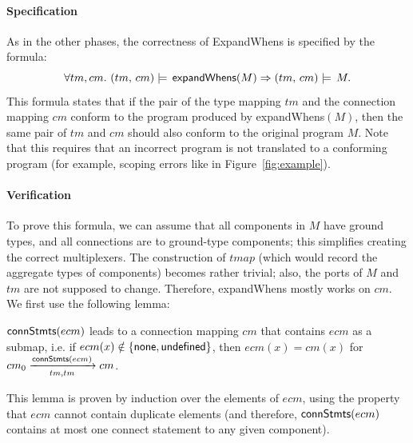 

\paragraph*{Specification}
As in the other phases, the correctness of {ExpandWhens} is specified by the formula:
%
\begin{equation}\label{eqn:expand-whens-spec}
    \forall tm, cm.\ (tm,\,cm) \models \, {\sf expandWhens}(M) \Rightarrow (tm,\,cm) \models \,M.
\end{equation}
%
This formula states that if the pair of the type mapping $tm$ and the connection mapping $cm$ conform to the program produced by {\sf expandWhens}$(M)$,
then the same pair of $tm$ and $cm$ should also conform to the original program $M$.
Note that this requires that an incorrect program is not translated to a conforming program
(for example, scoping errors like in Figure~\ref{fig:example}).

\paragraph*{Verification}
To prove this formula, we can assume that all components in $M$ have ground types,
and all connections are to ground-type components;
this simplifies creating the correct multiplexers.
The construction of $tmap$ (which would record the aggregate types of components) becomes rather trivial;
also, the ports of $M$ and $tm$ are not supposed to change.
Therefore, {\sf expandWhens} mostly works on $cm$.
We first use the following lemma:
%
\begin{lemma}\label{lem:expand-whens-auxiliary}
${\sf connStmts}(ecm)$ leads to a connection mapping $cm$ that contains $ecm$ as a submap,
i.e. if $ecm(x) \notin \{ {\sf none}, {\sf undefined} \}$, then $ecm(x) = cm(x)$
for $cm_0 \xrightarrow[tm, tm]{{\sf connStmts}(ecm)} cm$.
\end{lemma}
%
This lemma is proven by induction over the elements of $ecm$,
using the property that $ecm$ cannot contain duplicate elements
(and therefore, ${\sf connStmts}(ecm)$ contains at most one connect statement to any given component).

